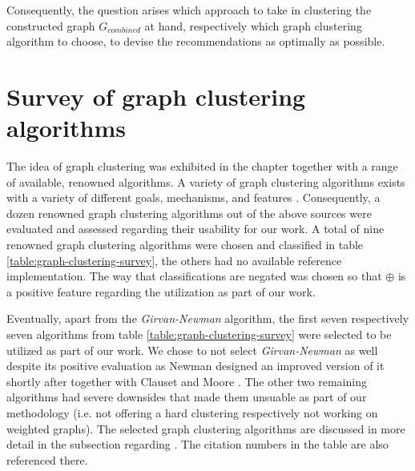 \documentclass[12pt,a4paper]{report}
\begin{document}
Consequently, the question arises which approach to take in clustering the
constructed graph \(G_{combined}\) at hand, respectively which graph clustering
algorithm to choose, to devise the recommendations as optimally as possible.



\section{Survey of graph clustering algorithms} \label{sect:graph-clustering-algorithm-survey}

The idea of graph clustering was exhibited in the \textit{}
chapter together with a range of available, renowned algorithms.
A variety of graph clustering algorithms exists with a variety of different
goals, mechanisms, and features
\cite{lancichinetti2009community, fortunato2010community, danon2005comparing}.
Consequently, a dozen renowned graph clustering algorithms out of the above sources
were evaluated and assessed regarding their usability for our work.
A total of nine renowned graph clustering algorithms were chosen and classified
in table \ref{table:graph-clustering-survey}, the others had no available
reference implementation.
The way that classifications are negated was chosen so that $\oplus$
is a positive feature regarding the utilization as part of our work.

Eventually, apart from the \textit{Girvan-Newman} algorithm, the first seven
respectively seven algorithms from table
\ref{table:graph-clustering-survey} were selected to be utilized as part of our work.
We chose to not select \textit{Girvan-Newman} as well despite its positive evaluation as Newman
designed an improved version of it shortly after together with Clauset and Moore
\cite{clauset2004modularity}.
The other two remaining algorithms had severe downsides that made them unsuable
as part of our methodology (i.e. not offering a hard clustering respectively
not working on weighted graphs).
The selected graph clustering algorithms are discussed in more detail in the
\textit{} subsection regarding
\textit{}.
The citation numbers in the table are also referenced there.
\end{document}
